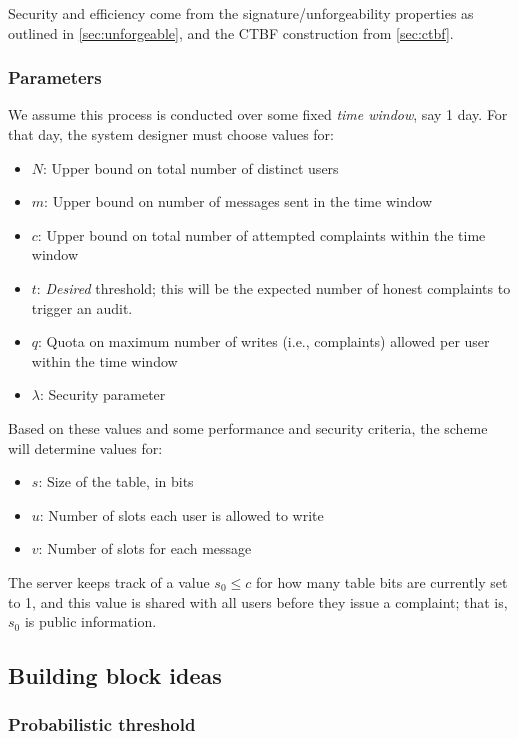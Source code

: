 \documentclass[letterpaper,12pt]{article}
\begin{document}
Security and efficiency come from the signature/unforgeability
properties as outlined in \cref{sec:unforgeable}, and the CTBF
construction from \cref{sec:ctbf}.

\subsubsection{Parameters}

We assume this process is conducted over some fixed \emph{time window},
say 1 day. For that day, the system designer must choose values for:
\begin{itemize}
  \item $N$: Upper bound on total number of distinct users
  \item $m$: Upper bound on number of messages sent in the time window
  \item $c$: Upper bound on total number of attempted complaints within
    the time window
  \item $t$: \emph{Desired} threshold; this will be the expected number
    of honest complaints to trigger an audit.
  \item $q$: Quota on maximum number of writes (i.e., complaints)
    allowed per user within the time window
  \item $\lambda$: Security parameter
\end{itemize}

Based on these values and some performance and security criteria, the
scheme will determine values for:
\begin{itemize}
  \item $s$: Size of the table, in bits
  \item $u$: Number of slots each user is allowed to write
  \item $v$: Number of slots for each message
\end{itemize}

The server keeps track of a value $s_0\le c$ for how many table bits are
currently set to 1, and this value is shared with all users before they
issue a complaint; that is, $s_0$ is public information.

\subsection{Building block ideas}

\subsubsection{Probabilistic threshold}\label{sec:prob-thresh}
\end{document}
